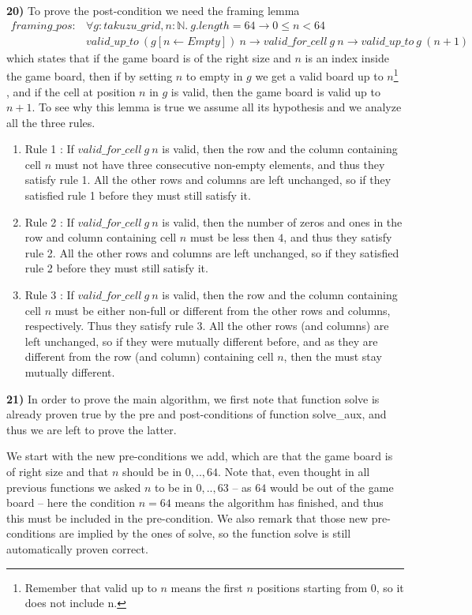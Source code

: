 \documentclass[]{StandardTemplate}
\begin{document}
\textbf{20)} To prove the post-condition we need the framing lemma
\begin{align*}
framing\_pos : &\forall g : takuzu\_grid, n : \mathbb{N}.~g.length = 64 \to 0 \leq n < 64\\ &valid\_up\_to~(g[n \leftarrow Empty])~n \to valid\_for\_cell~g~n \to valid\_up\_to~g~(n+1)
\end{align*}
which states that if the game board is of the right size and $ n $ is an index inside the game board, then if by setting $ n $ to empty in $ g $ we get a valid board up to $ n $\footnote{Remember that valid up to $ n $ means the first $ n $ positions starting from $ 0 $, so it does not include n.} , and if the cell at position $ n $ in $ g $ is valid, then the game board is valid up to $ n+1 $. To see why this lemma is true we assume all its hypothesis and we analyze all the three rules. 
\begin{enumerate}
\item Rule 1 : If $ valid\_for\_cell~g~n $ is valid, then the row and the column containing cell $ n $ must not have three consecutive non-empty elements, and thus they satisfy rule 1. All the other rows and columns are left unchanged, so if they satisfied rule 1 before they must still satisfy it.
\item Rule 2 : If $ valid\_for\_cell~g~n $ is valid, then the number of zeros and ones in the row and column containing cell $ n $ must be less then $ 4 $, and thus they satisfy rule 2. All the other rows and columns are left unchanged, so if they satisfied rule 2 before they must still satisfy it.
\item Rule 3 : If $ valid\_for\_cell~g~n $ is valid, then the row and the column containing cell $ n $ must be either non-full or different from the other rows and columns, respectively. Thus they satisfy rule 3. All the other rows (and columns) are left unchanged, so if they were mutually different before, and as they are different from the row (and column) containing cell $ n $, then the must stay mutually different.
\end{enumerate}

\textbf{21)} In order to prove the main algorithm, we first note that function solve is already proven true by the pre and post-conditions of function solve\_aux, and thus we are left to prove the latter. 

We start with the new pre-conditions we add, which are that the game board is of right size and that $ n $ should be in $0,..,64 $. Note that, even thought in all previous functions we asked $ n $ to be in $ 0,..,63 $ -- as $ 64 $ would be out of the game board -- here the condition $ n=64 $ means the algorithm has finished, and thus this must be included in the pre-condition. We also remark that those new pre-conditions are implied by the ones of solve, so the function solve is still automatically proven correct.
\end{document}

